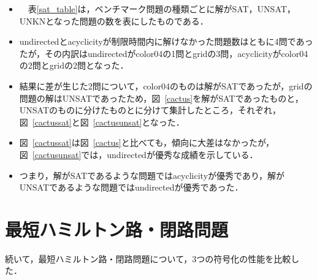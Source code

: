 \begin{itemize}
\item　表\ref{sat_table}は，ベンチマーク問題の種類ごとに解がSAT，UNSAT，UNKNとなった問題の数を表にしたものである．
\item \textsf{undirected}と\textsf{acyclicity}が制限時間内に解けなかった問題数はともに4問であったが，その内訳は\textsf{undirected}がcolor04の1問とgridの3問，\textsf{acyclicity}がcolor04の2問とgridの2問となった．
\item 結果に差が生じた2問について，color04のものは解がSATであったが，gridの問題の解はUNSATであったため，図~\ref{cactus}を解がSATであったものと，UNSATのものに分けたものとに分けて集計したところ，それぞれ，図~\ref{cactussat}と図~\ref{cactusunsat}となった．
\item 図~\ref{cactussat}は図~\ref{cactus}と比べても，傾向に大差はなかったが，図~\ref{cactusunsat}では，\textsf{undirected}が優秀な成績を示している．
\item つまり，解がSATであるような問題では\textsf{acyclicity}が優秀であり，解がUNSATであるような問題では\textsf{undirected}が優秀であった．
\end{itemize}


\section{最短ハミルトン路・閉路問題}


続いて，最短ハミルトン路・閉路問題について，3つの符号化の性能を比較した．

